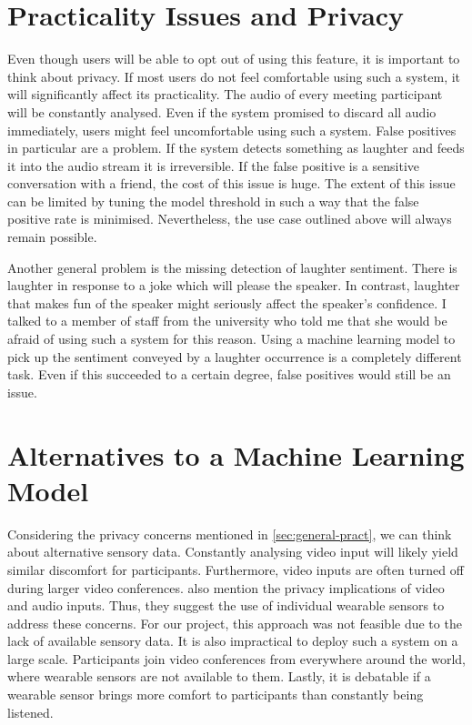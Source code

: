 \documentclass[bsc,frontabs,parskip,deptreport]{infthesis}
\begin{document}
\section{Practicality Issues and Privacy} \label{sec:general-pract}
Even though users will be able to opt out of using this feature, it is important to think about privacy. If most users do not feel comfortable using such a system, it will significantly affect its practicality.  
The audio of every meeting participant will be constantly analysed. Even if the system promised to discard all audio immediately, users might feel uncomfortable using such a system. False positives in particular are a problem. If the system detects something as laughter and feeds it into the audio stream it is irreversible. If the false positive is a sensitive conversation with a friend, the cost of this issue is huge. 
The extent of this issue can be limited by tuning the model threshold in such a way that the false positive rate is minimised. Nevertheless, the use case outlined above will always remain possible. 

Another general problem is the missing detection of laughter sentiment. There is laughter in response to a joke which will please the speaker. In contrast, laughter that makes fun of the speaker might seriously affect the speaker's confidence. I talked to a member of staff from the university who told me that she would be afraid of using such a system for this reason. 
Using a machine learning model to pick up the sentiment conveyed by a laughter occurrence is a completely different task. Even if this succeeded to a certain degree, false positives would still be an issue.


\section{Alternatives to a Machine Learning Model}
Considering the privacy concerns mentioned in \autoref{sec:general-pract}, we can think about alternative sensory data. 
Constantly analysing video input will likely yield similar discomfort for participants. Furthermore, video inputs are often turned off during larger video conferences.
\citet{cosentino2016quantitative}  also mention the privacy implications of video and audio inputs.
Thus, they suggest the use of individual wearable sensors to address these concerns. For our project, this approach was not feasible due to the lack of available sensory data.
It is also impractical to deploy such a system on a large scale. Participants join video conferences from everywhere around the world, where wearable sensors are not available to them. Lastly, it is debatable if a wearable sensor brings more comfort to participants than constantly being listened. 
\end{document}
